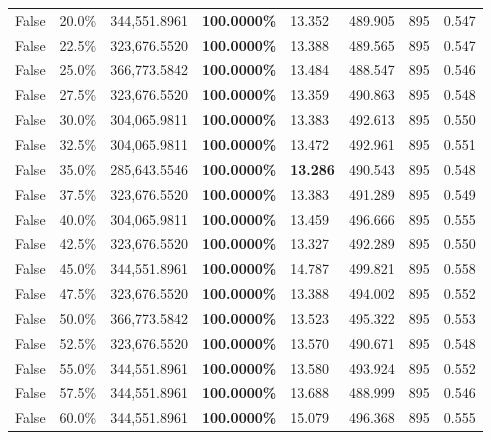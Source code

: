 \begin{table}[H]
\begin{tabular}{lllrllll}
\cline{1-8}
False & 20.0\% & 344,551.8961 & \bfseries \color{red} 100.0000\% & 13.352 & 489.905 & 895 & 0.547 \\
\cline{1-8}
False & 22.5\% & 323,676.5520 & \bfseries \color{red} 100.0000\% & 13.388 & 489.565 & 895 & 0.547 \\
\cline{1-8}
False & 25.0\% & 366,773.5842 & \bfseries \color{red} 100.0000\% & 13.484 & 488.547 & 895 & 0.546 \\
\cline{1-8}
False & 27.5\% & 323,676.5520 & \bfseries \color{red} 100.0000\% & 13.359 & 490.863 & 895 & 0.548 \\
\cline{1-8}
False & 30.0\% & 304,065.9811 & \bfseries \color{red} 100.0000\% & 13.383 & 492.613 & 895 & 0.550 \\
\cline{1-8}
False & 32.5\% & 304,065.9811 & \bfseries \color{red} 100.0000\% & 13.472 & 492.961 & 895 & 0.551 \\
\cline{1-8}
False & 35.0\% & \color{red} 285,643.5546 & \bfseries \color{red} 100.0000\% & \bfseries \color{red} 13.286 & 490.543 & 895 & 0.548 \\
\cline{1-8}
False & 37.5\% & 323,676.5520 & \bfseries \color{red} 100.0000\% & 13.383 & 491.289 & 895 & 0.549 \\
\cline{1-8}
False & 40.0\% & 304,065.9811 & \bfseries \color{red} 100.0000\% & 13.459 & 496.666 & 895 & 0.555 \\
\cline{1-8}
False & 42.5\% & 323,676.5520 & \bfseries \color{red} 100.0000\% & 13.327 & 492.289 & 895 & 0.550 \\
\cline{1-8}
False & 45.0\% & 344,551.8961 & \bfseries \color{red} 100.0000\% & 14.787 & 499.821 & 895 & 0.558 \\
\cline{1-8}
False & 47.5\% & 323,676.5520 & \bfseries \color{red} 100.0000\% & 13.388 & 494.002 & 895 & 0.552 \\
\cline{1-8}
False & 50.0\% & 366,773.5842 & \bfseries \color{red} 100.0000\% & 13.523 & 495.322 & 895 & 0.553 \\
\cline{1-8}
False & 52.5\% & 323,676.5520 & \bfseries \color{red} 100.0000\% & 13.570 & 490.671 & 895 & 0.548 \\
\cline{1-8}
False & 55.0\% & 344,551.8961 & \bfseries \color{red} 100.0000\% & 13.580 & 493.924 & 895 & 0.552 \\
\cline{1-8}
False & 57.5\% & 344,551.8961 & \bfseries \color{red} 100.0000\% & 13.688 & 488.999 & 895 & 0.546 \\
\cline{1-8}
False & 60.0\% & 344,551.8961 & \bfseries \color{red} 100.0000\% & 15.079 & 496.368 & 895 & 0.555 \\

\end{tabular}
\end{table}
